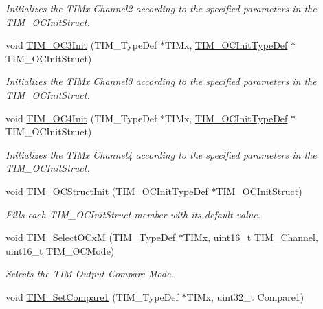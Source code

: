 \begin{DoxyCompactItemize}
\begin{DoxyCompactList}\small\item\em Initializes the T\-I\-Mx Channel2 according to the specified parameters in the T\-I\-M\-\_\-\-O\-C\-Init\-Struct. \end{DoxyCompactList}\item 
void \hyperlink{group___t_i_m_ga90d4a358d4e6d4c5ed17dc1d6beb5f30}{T\-I\-M\-\_\-\-O\-C3\-Init} (T\-I\-M\-\_\-\-Type\-Def $\ast$T\-I\-Mx, \hyperlink{struct_t_i_m___o_c_init_type_def}{T\-I\-M\-\_\-\-O\-C\-Init\-Type\-Def} $\ast$T\-I\-M\-\_\-\-O\-C\-Init\-Struct)
\begin{DoxyCompactList}\small\item\em Initializes the T\-I\-Mx Channel3 according to the specified parameters in the T\-I\-M\-\_\-\-O\-C\-Init\-Struct. \end{DoxyCompactList}\item 
void \hyperlink{group___t_i_m_ga64571ebbb58cac39a9e760050175f11c}{T\-I\-M\-\_\-\-O\-C4\-Init} (T\-I\-M\-\_\-\-Type\-Def $\ast$T\-I\-Mx, \hyperlink{struct_t_i_m___o_c_init_type_def}{T\-I\-M\-\_\-\-O\-C\-Init\-Type\-Def} $\ast$T\-I\-M\-\_\-\-O\-C\-Init\-Struct)
\begin{DoxyCompactList}\small\item\em Initializes the T\-I\-Mx Channel4 according to the specified parameters in the T\-I\-M\-\_\-\-O\-C\-Init\-Struct. \end{DoxyCompactList}\item 
void \hyperlink{group___t_i_m_ga394683c78ae02837882e36014e11643e}{T\-I\-M\-\_\-\-O\-C\-Struct\-Init} (\hyperlink{struct_t_i_m___o_c_init_type_def}{T\-I\-M\-\_\-\-O\-C\-Init\-Type\-Def} $\ast$T\-I\-M\-\_\-\-O\-C\-Init\-Struct)
\begin{DoxyCompactList}\small\item\em Fills each T\-I\-M\-\_\-\-O\-C\-Init\-Struct member with its default value. \end{DoxyCompactList}\item 
void \hyperlink{group___t_i_m_ga83ea0af5a7c1af521236ce5e4d2c42b0}{T\-I\-M\-\_\-\-Select\-O\-Cx\-M} (T\-I\-M\-\_\-\-Type\-Def $\ast$T\-I\-Mx, uint16\-\_\-t T\-I\-M\-\_\-\-Channel, uint16\-\_\-t T\-I\-M\-\_\-\-O\-C\-Mode)
\begin{DoxyCompactList}\small\item\em Selects the T\-I\-M Output Compare Mode. \end{DoxyCompactList}\item 
void \hyperlink{group___t_i_m_ga48631e66c32bb905946664f4722b2546}{T\-I\-M\-\_\-\-Set\-Compare1} (T\-I\-M\-\_\-\-Type\-Def $\ast$T\-I\-Mx, uint32\-\_\-t Compare1)

\end{DoxyCompactItemize}
